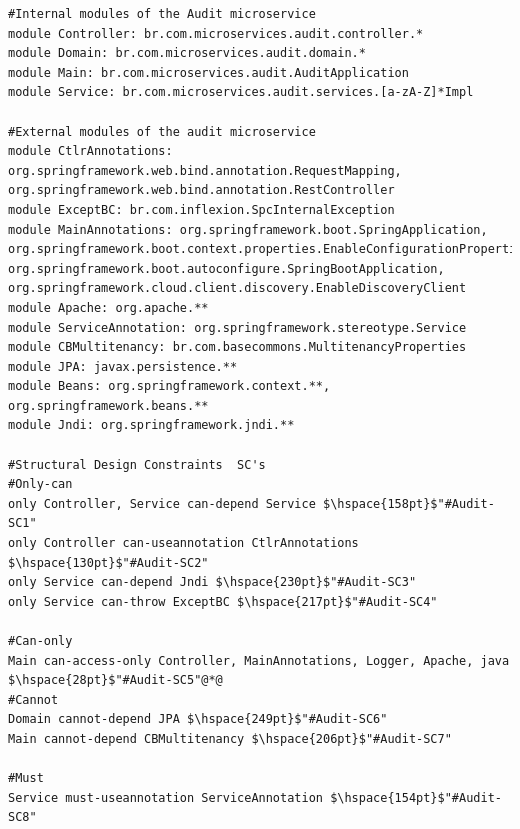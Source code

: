 \documentclass[12pt]{article}
\begin{document}
\vspace{-0.04cm}
\begin{lstlisting}[style=colorido, caption={\textcolor{blue}{Audit microservice's architectural design specification.}},label={list:especArquiteturalAudit}
]
#Internal modules of the Audit microservice
module Controller: br.com.microservices.audit.controller.*
module Domain: br.com.microservices.audit.domain.*
module Main: br.com.microservices.audit.AuditApplication
module Service: br.com.microservices.audit.services.[a-zA-Z]*Impl

#External modules of the audit microservice
module CtlrAnnotations:  org.springframework.web.bind.annotation.RequestMapping,  org.springframework.web.bind.annotation.RestController
module ExceptBC: br.com.inflexion.SpcInternalException
module MainAnnotations: org.springframework.boot.SpringApplication, org.springframework.boot.context.properties.EnableConfigurationProperties, org.springframework.boot.autoconfigure.SpringBootApplication, org.springframework.cloud.client.discovery.EnableDiscoveryClient
module Apache: org.apache.**
module ServiceAnnotation: org.springframework.stereotype.Service
module CBMultitenancy: br.com.basecommons.MultitenancyProperties
module JPA: javax.persistence.**
module Beans: org.springframework.context.**, org.springframework.beans.**
module Jndi: org.springframework.jndi.**

#Structural Design Constraints  SC's
#Only-can		
only Controller, Service can-depend Service	$\hspace{158pt}$"#Audit-SC1"
only Controller can-useannotation CtlrAnnotations $\hspace{130pt}$"#Audit-SC2"
only Service can-depend Jndi $\hspace{230pt}$"#Audit-SC3"
only Service can-throw ExceptBC	$\hspace{217pt}$"#Audit-SC4"

#Can-only
Main can-access-only Controller, MainAnnotations, Logger, Apache, java $\hspace{28pt}$"#Audit-SC5"@*@
#Cannot
Domain cannot-depend JPA $\hspace{249pt}$"#Audit-SC6"
Main cannot-depend CBMultitenancy $\hspace{206pt}$"#Audit-SC7"

#Must 
Service must-useannotation ServiceAnnotation $\hspace{154pt}$"#Audit-SC8"
\end{lstlisting}
\end{document}

